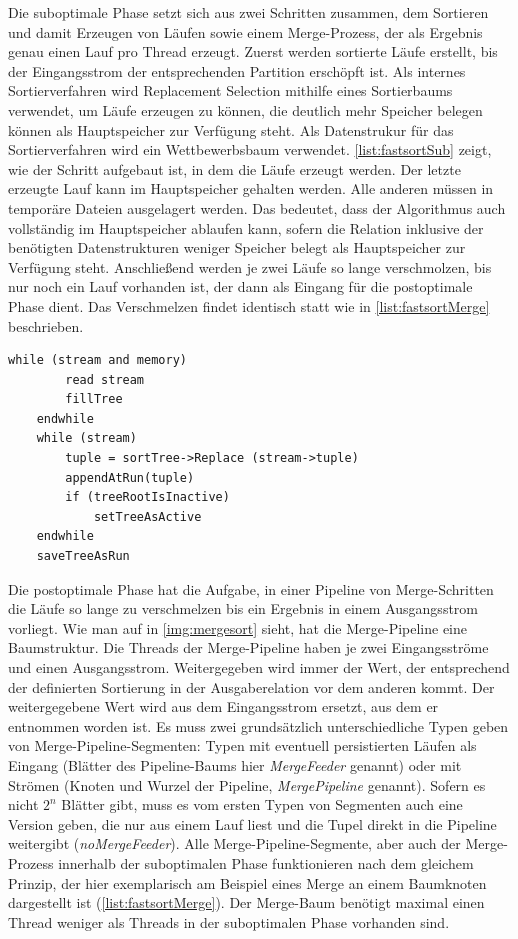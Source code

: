 \documentclass[a4paper,12pt,twoside]{article}
\newcommand{\Fb}[1]{\textit{#1}} %
\begin{document}
Die suboptimale Phase setzt sich aus zwei Schritten zusammen, dem Sortieren und damit Erzeugen von Läufen sowie einem Merge-Prozess, der als Ergebnis genau einen Lauf pro Thread erzeugt. Zuerst werden sortierte Läufe erstellt, bis der Eingangsstrom der entsprechenden Partition erschöpft ist. Als internes Sortierverfahren wird Replacement Selection mithilfe eines Sortierbaums verwendet, um Läufe erzeugen zu können, die deutlich mehr Speicher belegen können als Hauptspeicher zur Verfügung steht. Als Datenstrukur für das Sortierverfahren wird ein Wettbewerbsbaum verwendet. \autoref{list:fastsortSub} zeigt, wie der Schritt aufgebaut ist, in dem die Läufe erzeugt werden. Der letzte erzeugte Lauf kann im Hauptspeicher gehalten werden. Alle anderen müssen in temporäre Dateien ausgelagert werden. Das bedeutet, dass der Algorithmus auch vollständig im Hauptspeicher ablaufen kann, sofern die Relation inklusive der benötigten Datenstrukturen weniger Speicher belegt als Hauptspeicher zur Verfügung steht. Anschließend werden je zwei Läufe so lange verschmolzen, bis nur noch ein Lauf vorhanden ist, der dann als Eingang für die postoptimale Phase dient. Das Verschmelzen findet identisch statt wie in  \autoref{list:fastsortMerge} beschrieben.

\begin{minipage}{\linewidth}
	\begin{lstlisting}[caption={Fastsort: Erzeugen der Runs in der Suboptimalen Phase}, label=list:fastsortSub] 
	while (stream and memory) 
		read stream
		fillTree
	endwhile
	while (stream)
		tuple = sortTree->Replace (stream->tuple)
		appendAtRun(tuple)
		if (treeRootIsInactive)
			setTreeAsActive
	endwhile
	saveTreeAsRun
	\end{lstlisting}
\end{minipage}

Die postoptimale Phase hat die Aufgabe, in einer Pipeline von Merge-Schritten die Läufe so lange zu verschmelzen bis ein Ergebnis in einem Ausgangsstrom vorliegt. Wie man auf in \autoref{img:mergesort} sieht, hat die Merge-Pipeline eine Baumstruktur. Die Threads der Merge-Pipeline haben je zwei Eingangsströme und einen Ausgangsstrom. Weitergegeben wird immer der Wert, der entsprechend der definierten Sortierung in der Ausgaberelation vor dem anderen kommt. Der weitergegebene Wert wird aus dem Eingangsstrom ersetzt, aus dem er entnommen worden ist. Es muss zwei grundsätzlich unterschiedliche Typen geben von Merge-Pipeline-Segmenten: Typen mit eventuell persistierten Läufen als Eingang (Blätter des Pipeline-Baums hier \Fb{MergeFeeder} genannt) oder mit Strömen (Knoten und Wurzel der Pipeline, \Fb{MergePipeline} genannt). Sofern es nicht $2^n$ Blätter gibt, muss es vom ersten Typen von Segmenten auch eine Version geben, die nur aus einem Lauf liest und die Tupel direkt in die Pipeline weitergibt (\Fb{noMergeFeeder}). Alle Merge-Pipeline-Segmente, aber auch der Merge-Prozess innerhalb der suboptimalen Phase funktionieren nach dem gleichem Prinzip, der hier exemplarisch am Beispiel eines Merge an einem Baumknoten dargestellt ist (\autoref{list:fastsortMerge}). Der Merge-Baum benötigt maximal einen Thread weniger als Threads in der suboptimalen Phase vorhanden sind.
\end{document}
